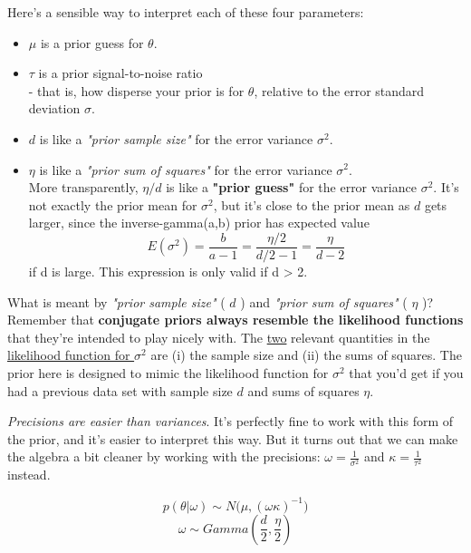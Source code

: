 \documentclass{homework}
\begin{document}
\par \noindent Here's a sensible way to interpret each of these four parameters:
\begin{itemize}
\item $\mu$ is a prior guess for $\theta$.
\item $\tau$ is a prior signal-to-noise ratio \\- that is, how disperse your prior is for $\theta$, relative to the error standard deviation $\sigma$.
\item $d$ is like a \textit{"prior sample size"} for the error variance $\sigma^2$.
\item $\eta$ is like a \textit{"prior sum of squares"} for the error variance $\sigma^2$. \\ More transparently, $\eta / d$ is like a \textbf{"prior guess"} for the error variance $\sigma^2$. It's not exactly the prior mean for $\sigma^2$, but it's close to the prior mean as $d$ gets larger, since the inverse-gamma(a,b) prior has expected value
$$E(\sigma^2) = \frac{b}{a - 1} = \frac{\eta/2}{d /2 - 1} = \frac{\eta}{d - 2}$$
if d is large.  This expression is only valid if d > 2.
\end{itemize}
\par \noindent What is meant by \textit{"prior sample size"} ( $d$ ) and \textit{"prior sum of squares"} ( $\eta$ )? 
\\Remember that \textbf{conjugate priors always resemble the likelihood functions} that they're intended to play nicely with. The \underline{two} relevant quantities in the \underline{likelihood function for $\sigma^2$} are (i) the sample size and (ii) the sums of squares. The prior here is designed to mimic the likelihood function for $\sigma^2$ that you'd get if you had a previous data set with sample size $d$ and sums of squares $\eta$.\\

\par \textit{Precisions are easier than variances}. It's perfectly fine to work with this form of the prior, and it's easier to interpret this way. But it turns out that we can make the algebra a bit cleaner by working with the precisions:  $\omega = \frac{1}{\sigma^2}$ and $\kappa = \frac{1}{\tau^2}$ instead.

$$p( \theta | \omega) \sim N\big(\mu, (\omega\kappa)^{-1} \big)$$
$$\omega \sim Gamma(\frac{d}{2}, \frac{\eta}{2} )$$
\end{document}

